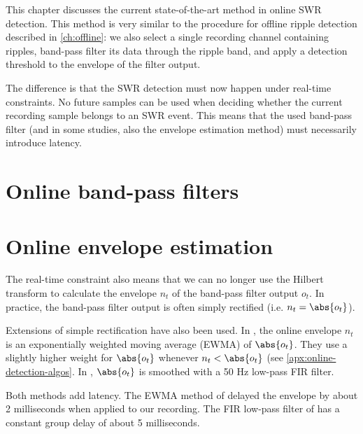 \label{ch:BPF}

This chapter discusses the current state-of-the-art method in online SWR detection. This method is very similar to the procedure for offline ripple detection described in \cref{ch:offline}: we also select a single recording channel containing ripples, band-pass filter its data through the ripple band, and apply a detection threshold to the envelope of the filter output.

The difference is that the SWR detection must now happen under real-time constraints. No future samples can be used when deciding whether the current recording sample belongs to an SWR event. This means that the used band-pass filter (and in some studies, also the envelope estimation method) must necessarily introduce latency.



\section{Online band-pass filters}




\section{Online envelope estimation}

The real-time constraint also means that we can no longer use the Hilbert transform to calculate the envelope $n_t$ of the band-pass filter output $o_t$. In practice, the band-pass filter output is often simply rectified (i.e. $n_t = \abs{o_t}$).

Extensions of simple rectification have also been used. In , the online envelope $n_t$ is an exponentially weighted moving average (EWMA) of $\abs{o_t}$. They use a slightly higher weight for $\abs{o_t}$  whenever $n_t < \abs{o_t}$ (see \cref{apx:online-detection-algos}. In , $\abs{o_t}$ is smoothed with a 50 Hz low-pass FIR filter.

Both methods add latency. The EWMA method of \citeauthor*{Jadhav2012} delayed the envelope by about 2 milliseconds when applied to our recording. The FIR low-pass filter of \citeauthor*{Dutta2018} has a constant group delay of about 5 milliseconds.

